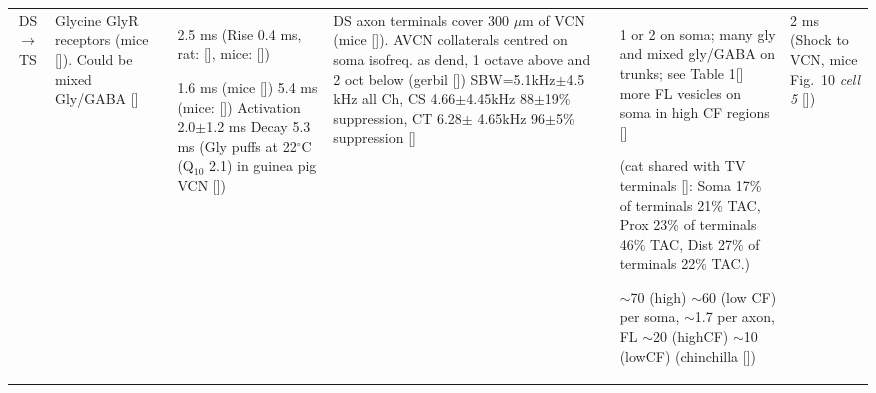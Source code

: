 \begin{longtable}{cYYYYYY}
DS\ensuremath{\rightarrow}TS                        
                                & %
Glycine GlyR receptors (mice []).
Could be mixed Gly/GABA [] 
                                & %
2.5 ms (Rise 0.4 ms, rat: [],
mice: [])


1.6 ms (mice [])
5.4 ms (mice: [])    
Activation 2.0$\pm$1.2 ms Decay 5.3 ms (Gly puffs at 22$^\circ$C (Q$_{10}$ 2.1) in  guinea pig VCN [])
                                & %
DS axon terminals cover 300 $\mu$m of VCN (mice []).
AVCN collaterals centred on soma isofreq. as dend, 1 octave above and 2 oct below (gerbil []) 
SBW=5.1kHz$\pm$4.5 kHz all Ch, CS 4.66$\pm$4.45kHz 88$\pm$19\% suppression, CT 6.28$\pm$ 4.65kHz    96$\pm$5\% suppression []
                                & %

                                & %
1 or 2 on soma; many gly and mixed gly/GABA on trunks; see Table 1[] 
more FL vesicles on soma in high CF regions []      

(cat shared with TV terminals []: 
Soma 17\% of terminals 21\% TAC,
Prox 23\% of terminals 46\% TAC,
Dist 27\% of terminals 22\% TAC.)


$\sim$70 (high) $\sim$60 (low CF) per soma, 
$\sim$1.7 per axon, FL $\sim$20 (highCF)
$\sim$10 (lowCF) (chinchilla [])                

                                & 
2 ms (Shock to VCN, mice Fig.~10 \textit{cell 5} [])


\end{longtable}
